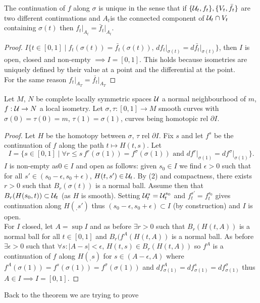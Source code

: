\documentclass[10pt,a4paper]{article}
\begin{document}
\begin{lemma}
The continuation of $f$ along $\sigma$ is unique in the sense that if $\{\mathcal{U}_t,f_t\},\{V_t,\bar{f}_t\}$ are two different continuations and $A_t$is the connected component of $\mathcal{U}_t\cap V_t$ containing $\sigma(t)$ then $f_t\vert_{A_t} = \bar{f}_t\vert_{A_t}$.
\end{lemma}
\begin{proof}
$I  \{t\in[0,1]\mid f_t(\sigma(t)) = \bar{f_t}(\sigma(t)),\, df_t\vert_{\sigma(t)}=d\bar{f_t}\vert_{\sigma(t)} \}$, then $I$ is open, closed and non-empty $\implies I=[0,1]$. This holds because isometries are uniquely defined by their value at a point and the differential at the point. \\
For the same reason $f_t\vert_{A_T} = \bar{f_t}\vert_{A_T}$
\end{proof}


\begin{lemma}
Let $M$, $N$ be complete locally symmetric spaces $\mathcal{U}$ a normal neighbourhood of $m$, $f:\mathcal{U}\to N$ a local isometry. Let $\sigma, \tau:[0,1]\to M$ smooth curves with $\sigma(0)=\tau(0) = m$, $\tau(1)=\sigma(1)$, curves being homotopic rel $\partial I$.
\begin{proof}
Let $H$ be the homotopy between $\sigma$, $\tau$ rel $\partial I$. Fix $s$ and let $f^s$ be the continuation of $f$ along the path $t\mapsto H(t,s)$. Let \[I=\{s\in [0,1]\mid \forall r\leq s \, f^r(\sigma(1))=f^\sigma(\sigma(1))\text{ and } df^r\vert_{\sigma(1)} = df^\sigma\vert_{\sigma(1)}\}.\]
$I$ is non-empty as$0\in I$ and open as follows: given $s_0\in I$ we find $\epsilon>0$ such that for all $s'\in(s_0-\epsilon, s_0+\epsilon)$, $H(t,s')\in \mathcal{U}_t$. By (2) and compactness, there exists $r>0$ such that $B_r(\sigma(t))$ is a normal ball. Assume then that $B_r(H(s_0,t))\subset \mathcal{U}_t$ (as $H$ is smooth). Setting $\mathcal{U}^s_t = \mathcal{U}^{s_0}_t$ and $f^{s'}_t = f^{s_0}_t$ gives continuation along $H(_,s')$ thus $(s_0-\epsilon,s_0+\epsilon)\subset I$ (by construction) and $I$ is open. \\
For $I$ closed, let $A= \sup I$ and as before $\exists r>0$ such that $B_r(H(t,A))$ is a normal ball for all $t\in [0,1]$ and $B_r(f^A(H(t,A))$ is a normal ball. As before $\exists \epsilon>0$ such that $\forall s: \vert A-s\vert<\epsilon$, $H(t,s)\in B_r(H(t,A))$ so $f^A$ is a continuation of $f$ along $H(_,s)$ for $s\in(A-\epsilon,A)$ where $f^A(\sigma(1)) = f^s(\sigma(1)) = f^\sigma(\sigma(1)) $ and $df^A_{\sigma(1)} = df^s_{\sigma(1)} = df^\sigma_{\sigma(1)}$ thus $A\in I\implies I =[0,1]$.
\end{proof}
\end{lemma}
Back to the theorem we are trying to prove
\end{document}
